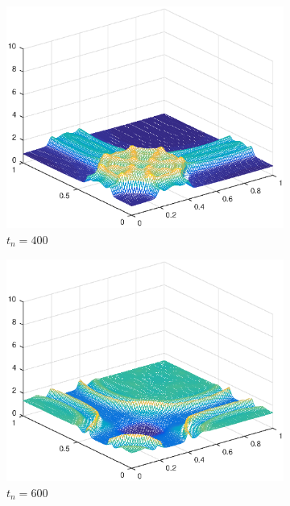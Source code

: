 \begin{figure}[h!]
\begin{subfigure}[t]{0.48\textwidth}
        \centering
        \includegraphics[width=\textwidth]{images/sol_ri_0400_per.eps}
        \caption{$t_{n}=400$}
        \label{fig:100}
    \end{subfigure}
    \begin{subfigure}[t]{0.48\textwidth}
        \centering
        \includegraphics[width=\textwidth]{images/sol_ri_0600_per.eps}
        \caption{$t_{n}=600$}
        \label{fig:100}
    \end{subfigure}
    \begin{subfigure}[t]{0.48\textwidth}
        \centering

\end{subfigure}
\end{figure}
